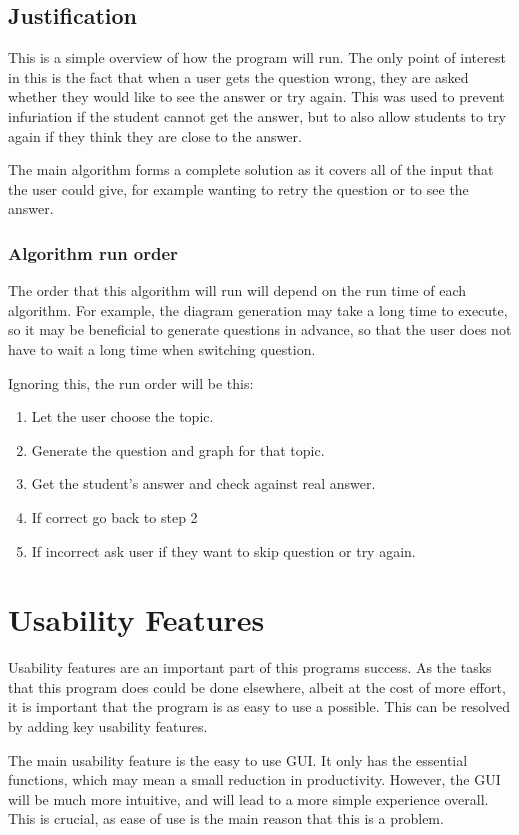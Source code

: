 \subsection{Justification}
This is a simple overview of how the program will run. The only point of interest in this is the fact that when a user gets the question wrong, they are asked whether they would like to see the answer or try again. This was used to prevent infuriation if the student cannot get the answer, but to also allow students to try again if they think they are close to the answer. 

The main algorithm forms a complete solution as it covers all of the input that the user could give, for example wanting to retry the question or to see the answer.
\subsubsection{Algorithm run order}
The order that this algorithm will run will depend on the run time of each algorithm. For example, the diagram generation may take a long time to execute, so it may be beneficial to generate questions in advance, so that the user does not have to wait a long time when switching question. 

Ignoring this, the run order will be this:
\begin{enumerate}
	\item Let the user choose the topic.
	\item Generate the question and graph for that topic.
	\item Get the student's answer and check against real answer.
	\item If correct go back to step 2
	\item If incorrect ask user if they want to skip question or try again.
\end{enumerate} 


\section{Usability Features}
Usability features are an important part of this programs success. As the tasks that this program does could be done elsewhere, albeit at the cost of more effort, it is important that the program is as easy to use a possible. This can be resolved by adding key usability features.

The main usability feature is the easy to use GUI. It only has the essential functions, which may mean a small reduction in productivity. However, the GUI will be much more intuitive, and will lead to a more simple experience overall. This is crucial, as ease of use is the main reason that this is a problem.

